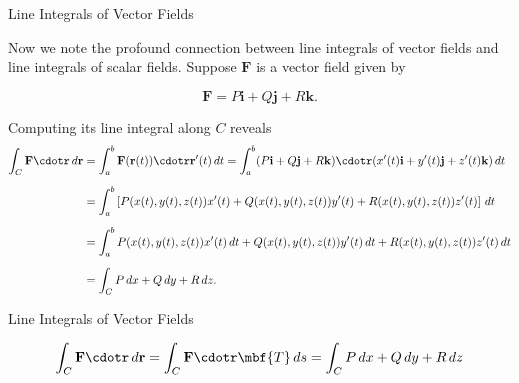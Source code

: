 \documentclass[11pt,english,
handout
]{beamer}
\begin{document}
\begin{frame}[t]{Line Integrals of Vector Fields}
\small

Now we note the profound connection between line integrals of vector fields and line integrals of scalar fields. Suppose $\mathbf{F}$ is a vector field given by 

\[
\mathbf{F}=P\mathbf{i}+Q\mathbf{j}+R\mathbf{k}.
\] \pause

Computing its line integral along $C$ reveals
\lspace 
{\scriptsize
\begin{align*}
\int_C\mathbf{F}\cdotr\,d\mathbf{r}&= \int_a^b\mathbf{F}(\mathbf{r}(t))\cdotr\mathbf{r}'(t)\,dt=\int_a^b (P\mathbf{i}+Q\mathbf{j}+R\mathbf{k})\cdotr(x'(t)\mathbf{i}+y'(t)\mathbf{j}+z'(t)\mathbf{k})\,dt\\[2mm]
&=\int_a^b\left[P(x(t),y(t),z(t))x'(t)+Q(x(t),y(t),z(t))y'(t)+R(x(t),y(t),z(t))z'(t)\right]\,dt\\[2mm]
&=\int_a^bP(x(t),y(t),z(t))x'(t)\,dt+Q(x(t),y(t),z(t))y'(t)\,dt+R(x(t),y(t),z(t))z'(t)\,dt\\[2mm]
&=\int_CP\,dx+Q\,dy+R\,dz.
\end{align*}
}
\end{frame}








\begin{frame}{Line Integrals of Vector Fields}
\small


\[
\int_C\mathbf{F}\cdotr\,d\mathbf{r}=\int_C\mathbf{F}\cdotr\mbf{T}\,ds=\int_CP\,dx+Q\,dy+R\,dz
\]

\lspace
\centering
{}
\end{frame}
\end{document}
